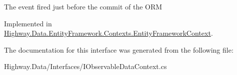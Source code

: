 The event fired just before the commit of the O\-R\-M 



Implemented in \hyperlink{class_highway_1_1_data_1_1_entity_framework_1_1_contexts_1_1_entity_framework_context_a4e307f212412dfd562cd70640d67709b}{Highway.\-Data.\-Entity\-Framework.\-Contexts.\-Entity\-Framework\-Context}.



The documentation for this interface was generated from the following file\-:\begin{DoxyCompactItemize}
\item 
Highway.\-Data/\-Interfaces/I\-Observable\-Data\-Context.\-cs\end{DoxyCompactItemize}
